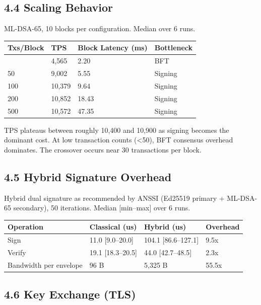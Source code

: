 \documentclass[
]{article}
\newcounter{none} %
\begin{document}
\subsection{4.4 Scaling Behavior}\label{scaling-behavior}

ML-DSA-65, 10 blocks per configuration. Median over 6 runs.

{\def\LTcaptype{none} %
\begin{longtable}[]{@{}llll@{}}
\toprule\noalign{}
Txs/Block & TPS & Block Latency (ms) & Bottleneck \\
\midrule\noalign{}
\endhead
\bottomrule\noalign{}
\endlastfoot
10 & 4,565 & 2.20 & BFT \\
50 & 9,002 & 5.55 & Signing \\
100 & 10,379 & 9.64 & Signing \\
200 & 10,852 & 18.43 & Signing \\
500 & 10,572 & 47.35 & Signing \\
\end{longtable}
}

TPS plateaus between roughly 10,400 and 10,900 as signing becomes the
dominant cost. At low transaction counts (\textless50), BFT consensus
overhead dominates. The crossover occurs near 30 transactions per block.

\subsection{4.5 Hybrid Signature
Overhead}\label{hybrid-signature-overhead}

Hybrid dual signature as recommended by ANSSI (Ed25519 primary +
ML-DSA-65 secondary), 50 iterations. Median {[}min--max{]} over 6 runs.

{\def\LTcaptype{none} %
\begin{longtable}[]{@{}llll@{}}
\toprule\noalign{}
Operation & Classical (us) & Hybrid (us) & Overhead \\
\midrule\noalign{}
\endhead
\bottomrule\noalign{}
\endlastfoot
Sign & 11.0 {[}9.0--20.0{]} & 104.1 {[}86.6--127.1{]} & 9.5x \\
Verify & 19.1 {[}18.3--20.5{]} & 44.0 {[}42.7--48.5{]} & 2.3x \\
Bandwidth per envelope & 96 B & 5,325 B & 55.5x \\
\end{longtable}
}

\subsection{4.6 Key Exchange (TLS)}\label{key-exchange-tls}
\end{document}
